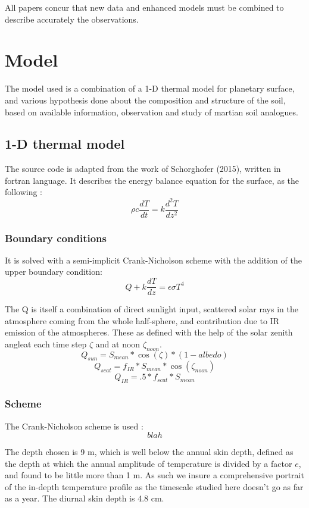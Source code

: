 \documentclass{report}
\begin{document}
All papers concur that new data and enhanced models must be combined to describe accurately the observations. 

\chapter{Model}
The model used is a combination of a 1-D thermal model for planetary surface, and various hypothesis done about the composition and structure of the soil, based on available information, observation and study of martian soil analogues. 

\section{1-D thermal model}
The source code is adapted from the work of Schorghofer (2015), written in fortran language. 
It describes the energy balance equation for the surface, as the following :
\[\rho c \frac{dT}{dt}=k\frac{d^2 T}{dz^2}\]

    \subsection{Boundary conditions}
It is solved with a semi-implicit Crank-Nicholson scheme with the addition of the upper boundary condition: 
\[Q + k \frac{dT}{dz} = \epsilon \sigma T^4\] 

The Q is itself a combination of direct sunlight input, scattered solar rays in the atmosphere coming from the whole half-sphere, and contribution due to IR emission of the atmospheres. These as defined with the help of the solar zenith angleat each time step  $\zeta$ and at noon $\zeta_{noon}$.
\[Q_{sun} = S_{mean}*\cos(\zeta)*(1-albedo) \]
\[Q_{scat} = f_{IR}*S_{mean} *\cos(\zeta_{noon}) \]
\[Q_{IR} = .5*f_{scat}*S_{mean}\]
    
    \subsection{Scheme}
The Crank-Nicholson scheme is used :
\[ blah \]

The depth chosen is 9 m, which is well below the annual skin depth, defined as the depth at which the annual amplitude of temperature is divided by a factor $e$, and found to be little more than 1 m.  As such we insure a comprehensive portrait of the in-depth temperature profile as the timescale studied here doesn't go as far as a year. The diurnal skin depth is 4.8 cm.
\end{document}
